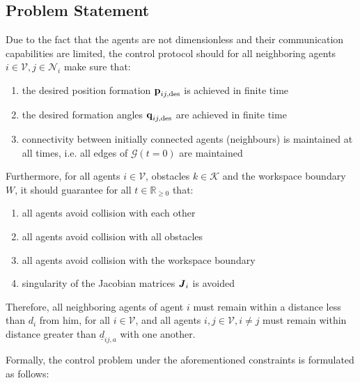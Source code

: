 \subsection{Problem Statement}
Due to the fact that the agents are not dimensionless and their communication
capabilities are limited, the control protocol should for all neighboring
agents $i \in \mathcal{V}, j \in \mathcal{N}_i$ make sure that:

\begin{enumerate}
  \item the desired position formation $\bm{\mathbf{p}}_{ij, \text{des}}$ is achieved
    in finite time
  \item the desired formation angles $\bm{\mathbf{q}}_{ij, \text{des}}$ are achieved
    in finite time
  \item connectivity between initially connected agents (neighbours) is
    maintained at all times, i.e. all edges of $\mathcal{G}(t=0)$ are maintained
\end{enumerate}
Furthermore, for all agents $i \in \mathcal{V}$, obstacles $k \in \mathcal{K}$
and the workspace boundary $W$, it should guarantee for all
$t\in\mathbb{R}_{\geq 0}$ that:

\begin{enumerate}
  \item all agents avoid collision with each other
  \item all agents avoid collision with all obstacles
  \item all agents avoid collision with the workspace boundary
  \item singularity of the Jacobian matrices $\bm{\mathit{J}}_i$ is avoided
\end{enumerate}

Therefore, all neighboring agents of agent $i$ must remain within a distance
less than $d_i$ from him, for all $i \in \mathcal{V}$,
and all agents $i, j\in \mathcal{V}, i \neq j$ must remain within distance
greater than $\underline{d}_{ij,a}$ with one another.

Formally, the control problem under the aforementioned constraints is
formulated as follows:

